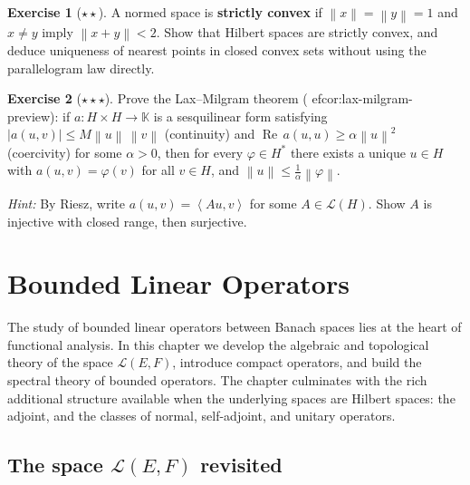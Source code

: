 \documentclass[a4paper,12pt]{book}
\newcommand{\K}{\mathbb{K}}
\newcommand{\norm}[1]{\left\| #1 \right\|}
\newcommand{\abs}[1]{\left| #1 \right|}
\newcommand{\inner}[2]{\left\langle #1, #2 \right\rangle}
\theoremstyle{definition}
\newtheorem{exercise}{Exercise}[chapter]
\theoremstyle{plain}
\theoremstyle{remark}
\begin{document}
\begin{exercise}[$\star\star$]
\label{exo:nearest-point-strictly-convex}
A normed space is \textbf{strictly convex} if
$\norm{x}=\norm{y}=1$ and $x\ne y$ imply $\norm{x+y}<2$.  Show that
Hilbert spaces are strictly convex, and deduce uniqueness of nearest
points in closed convex sets without using the parallelogram law directly.
\end{exercise}

\begin{exercise}[$\star\star\star$]
\label{exo:lax-milgram}
Prove the Lax--Milgram theorem (
ef{cor:lax-milgram-preview}):
if $a:H\times H\to\K$ is a sesquilinear form satisfying
$\abs{a(u,v)}\le M\norm{u}\,\norm{v}$ (continuity) and
$\operatorname{Re}\, a(u,u)\ge\alpha\norm{u}^2$ (coercivity) for some
$\alpha>0$, then for every $\varphi\in H^*$ there exists a unique $u\in H$
with $a(u,v)=\varphi(v)$ for all $v\in H$, and
$\norm{u}\le\frac{1}{\alpha}\norm{\varphi}$.

\textit{Hint:} By Riesz, write $a(u,v)=\inner{Au}{v}$ for some
$A\in\mathcal{L}(H)$.  Show $A$ is injective with closed range, then
surjective.
\end{exercise}
\chapter{Bounded Linear Operators}\label{ch:bounded-operators}
\minitoc

\vspace{1em}

The study of bounded linear operators between Banach spaces lies at the heart of
functional analysis. In this chapter we develop the algebraic and topological
theory of the space $\mathcal{L}(E,F)$, introduce compact operators, and build
the spectral theory of bounded operators. The chapter culminates with the rich
additional structure available when the underlying spaces are Hilbert spaces:
the adjoint, and the classes of normal, self-adjoint, and unitary operators.

\section{The space \texorpdfstring{$\mathcal{L}(E,F)$}{L(E,F)} revisited}
\end{document}
